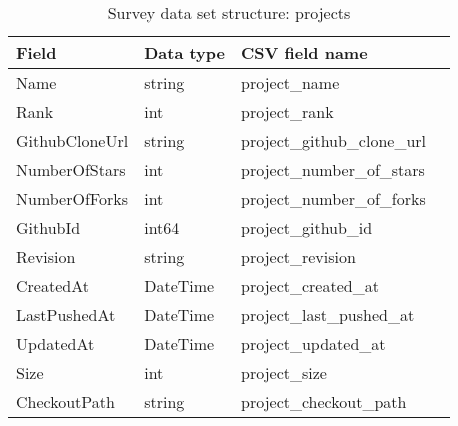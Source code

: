 \begin{table}[h]
    \centering
    \caption{Survey data set structure: projects}
    \label{tbl:datastructure-projects}
    \begin{tabular}{llll}
        \toprule
        Field & Data type & CSV field name \\
        \midrule
        Name           & string   & project\_name \\
        Rank           & int      & project\_rank \\
        GithubCloneUrl & string   & project\_github\_clone\_url \\
        NumberOfStars  & int      & project\_number\_of\_stars \\
        NumberOfForks  & int      & project\_number\_of\_forks \\
        GithubId       & int64    & project\_github\_id \\
        Revision       & string   & project\_revision \\
        CreatedAt      & DateTime & project\_created\_at \\
        LastPushedAt   & DateTime & project\_last\_pushed\_at \\
        UpdatedAt      & DateTime & project\_updated\_at \\
        Size           & int      & project\_size \\
        CheckoutPath   & string   & project\_checkout\_path \\
        \bottomrule
    \end{tabular}
\end{table}

